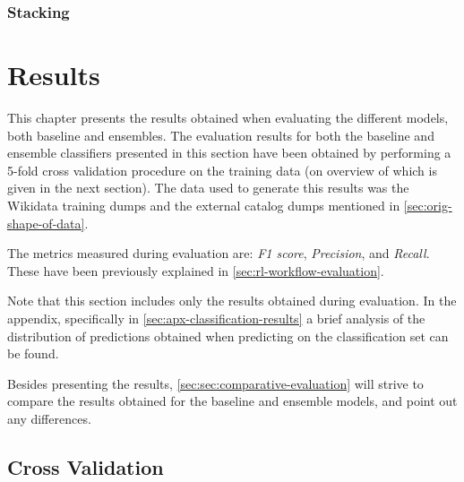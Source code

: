 \documentclass[epsfig,a4paper,11pt,titlepage,twoside,openany]{book}
\begin{document}


\subsection{Stacking}
\label{sec:ens-stacking}



\chapter{Results}
\label{chap:results}

This chapter presents the results obtained when evaluating the different models, both baseline and ensembles. The evaluation results for both the baseline and ensemble classifiers presented in this section have been obtained by performing a 5-fold cross validation procedure on the training data (on overview of which is given in the next section). The data used to generate this results was the Wikidata training dumps and the external catalog dumps mentioned in \autoref{sec:orig-shape-of-data}.

The metrics measured during evaluation are: \textit{F1 score}, \textit{Precision}, and \textit{Recall}. These have been previously explained in \autoref{sec:rl-workflow-evaluation}. 

Note that this section includes only the results obtained during evaluation. In the appendix, specifically in \autoref{sec:apx-classification-results} a brief analysis of the distribution of predictions obtained when predicting on the classification set can be found.

Besides presenting the results, \autoref{sec:sec:comparative-evaluation} will strive to compare the results obtained for the baseline and ensemble models, and point out any differences.


\section{Cross Validation}
\label{sec:cross-validation}
\end{document}
